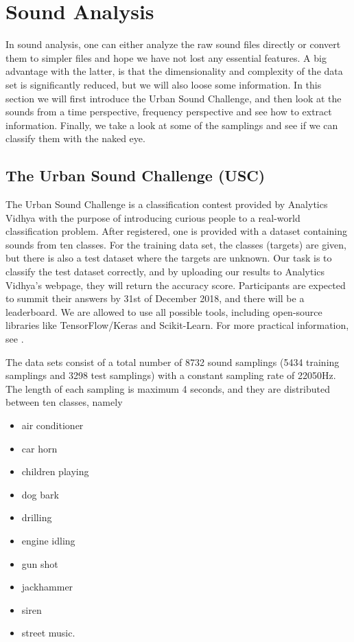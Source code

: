 \section{Sound Analysis}
In sound analysis, one can either analyze the raw sound files directly or convert them to simpler files and hope we have not lost any essential features. A big advantage with the latter, is that the dimensionality and complexity of the data set is significantly reduced, but we will also loose some information. In this section we will first introduce the Urban Sound Challenge, and then look at the sounds from a time perspective, frequency perspective and see how to extract information. Finally, we take a look at some of the samplings and see if we can classify them with the naked eye.

\subsection{The Urban Sound Challenge (USC)}
The Urban Sound Challenge is a classification contest provided by Analytics Vidhya with the purpose of introducing curious people to a real-world classification problem. After registered, one is provided with a dataset containing sounds from ten classes. For the training data set, the classes (targets) are given, but there is also a test dataset where the targets are unknown. Our task is to classify the test dataset correctly, and by uploading our results to Analytics Vidhya's webpage, they will return the accuracy score. Participants are expected to summit their answers by 31st of December 2018, and there will be a leaderboard. We are allowed to use all possible tools, including open-source libraries like TensorFlow/Keras and Scikit-Learn. For more practical information, see \cite{USC}.

The data sets consist of a total number of 8732 sound samplings (5434 training samplings and 3298 test samplings) with a constant sampling rate of 22050Hz. The length of each sampling is maximum 4 seconds, and they are distributed between ten classes, namely
\begin{multicols}{2}
	\begin{itemize}
		\setlength\itemsep{0.2em}
		\item air conditioner
		\item car horn
		\item children playing
		\item dog bark
		\item drilling
	\end{itemize}
	
	\columnbreak
	
	\begin{itemize}
		\setlength\itemsep{0.2em}
		\item engine idling
		\item gun shot
		\item jackhammer
		\item siren
		\item street music.
	\end{itemize}
\end{multicols}

